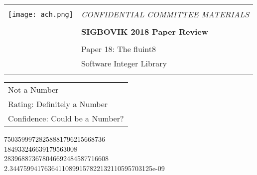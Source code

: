 \documentclass[12pt]{article}
\begin{document}
{\sffamily
\begin{tabular}{ll}
\multirow{3}{*}{\texttt{[image: ach.png]}}\\
& \Large{\em CONFIDENTIAL COMMITTEE MATERIALS} \\
&\\
& \textbf{\Huge{SIGBOVIK 2018 Paper Review}} \\
&\\
& \LARGE{Paper 18: The fluint8} \\[0.25em]
& \LARGE{Software Integer Library} \\
&\\
\hline
\end{tabular}}
\vspace{2em}
\thispagestyle{empty}

{\large\bf
\begin{tabular}{l}
Not a Number \\
Rating: Definitely a Number \\
Confidence: Could be a Number? \\
\end{tabular}}
\vspace{1em}

75035999728258881796215668736\\
184933246639179563008\\
283968873678046692484587716608\\
2.34475994176364110899157822132110595703125e-09
\end{document}
